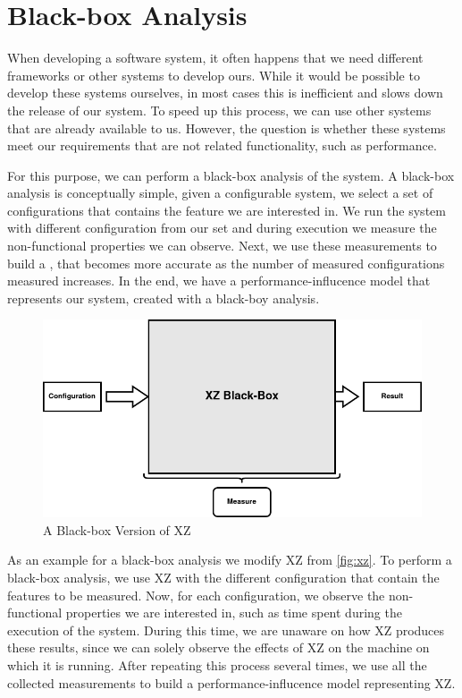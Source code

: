 \section{Black-box Analysis}\label{ch:Blackbox}
When developing a software system, it often happens that we need different frameworks or other systems to develop ours.
While it would be possible to develop these systems ourselves, in most cases this is inefficient and slows down the release of our system.
To speed up this process, we can use other systems that are already available to us. However, the question is whether these systems 
meet our requirements that are not related functionality, such as performance. 

For this purpose, we can perform a black-box analysis of the system. 
A black-box analysis is conceptually simple, given a configurable system, we select a set of configurations that contains the feature we are interested in. 
We run the system with different configuration from our set and during execution we measure the non-functional properties we can observe.
Next, we use these measurements to build a \perfInfluenceModel, that becomes more accurate as the number of measured configurations measured increases.
In the end, we have a performance-influcence model that represents our system, created with a black-boy analysis.

\begin{figure}[h]
    \centering
    \includegraphics[scale=0.6]{gfx/BlackBoxXZ.png}
    \caption{A Black-box Version of XZ}
    \label{fig:BBxz}
\end{figure}

As an example for a black-box analysis we modify XZ from \autoref{fig:xz}. To perform a black-box analysis, we use XZ with the different configuration that
contain the features to be measured. Now, for each configuration, we observe the non-functional properties we are interested in, such as time spent during the 
execution of the system. During this time, we are unaware on how XZ produces these results, since we can solely observe the effects of XZ  
on the machine on which it is running.
After repeating this process several times, we use all the collected measurements to build a performance-influcence model representing XZ. 

